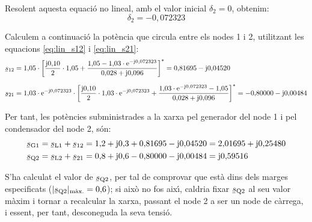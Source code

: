 \begin{exemple}
Resolent aquesta equaci\'{o} no lineal, amb el valor inicial $\delta_2=0$, obtenim:
\[\delta_2=-0{,}072323\]

Calculem a continuaci\'{o} la pot\`{e}ncia que circula entre els nodes 1 i 2, utilitzant les equacions \eqref{eq:lin_s12} i \eqref{eq:lin_s21}:
\begin{align*}
\cmplx{s}_{12} &= 1{,}05 \cdot\left[ \frac{\ju0{,}10}{2} \cdot1{,}05 + \frac{ 1{,}05 -
1{,}03\cdot\eu^{-\ju0{,}072323}} {0{,}028+\ju0{,}096} \right]^* =
0{,}81695 - \ju 0{,}04520 \\[1.5ex]
\cmplx{s}_{21} &= 1{,}03\cdot \eu^{-\ju0{,}072323} \cdot\left[ \frac{\ju0{,}10}{2}\cdot
1{,}03\cdot \eu^{-\ju0{,}072323} + \frac{ 1{,}03\cdot\eu^{-\ju0{,}072323} -1{,}05}
{0{,}028+\ju0{,}096} \right]^* = -0{,}80000 - \ju 0{,}00484
\end{align*}

Per tant, les pot\`{e}ncies subministrades a la xarxa pel generador del node 1 i pel
condensador del node 2, s\'{o}n:
\begin{align*}
 \cmplx{s}\ped{G1} &= \cmplx{s}\ped{L1} + \cmplx{s}_{12} = 1{,}2+\ju0{,}3 + 0{,}81695 - \ju 0{,}04520 = 2{,}01695 + \ju 0{,}25480 \\
 \cmplx{s}\ped{Q2} &= \cmplx{s}\ped{L2} + \cmplx{s}_{21} = 0{,}8+\ju0{,}6 - 0{,}80000 - \ju 0{,}00484 =  \ju 0{,}59516
\end{align*}

S'ha calculat el valor de $\cmplx{s}\ped{Q2}$, per tal de comprovar que est\`{a} dins dels
marges especificats ($|\cmplx{s}\ped{Q2}|_{\text{m\`{a}x.}}=0{,}6$); si aix\`{o} no fos aix\'{\i},
caldria fixar $\cmplx{s}\ped{Q2}$ al seu valor m\`{a}xim i tornar a recalcular la xarxa,
passant el node 2 a ser un node de c\`{a}rrega, i essent, per tant, desconeguda la seva
tensi\'{o}.
\end{exemple}



